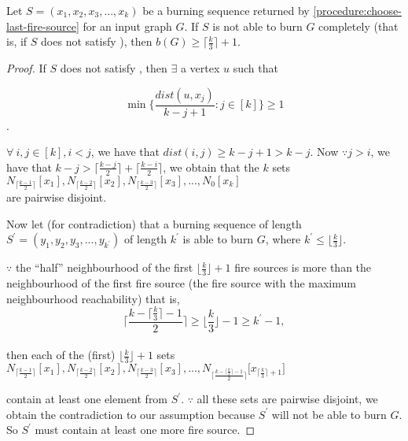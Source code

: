 \begin{lemma}\label{lemma:burn-seq-geq3}
Let $S = (x_1, x_2, x_3, . . ., x_k)$ be a burning sequence returned by \cref{procedure:choose-last-fire-source} for an input graph $G$. If $S$ is not able to burn $G$ completely (that is, if $S$ does not satisfy ), then $b(G)\geq \big\lceil \frac{k}{3}\big\rceil+1$.
\end{lemma}

\begin{proof}
If $S$ does not satisfy , then $\exists$ a vertex $u$ such that

$$\min \Big\{ \frac{dist(u,x_j)}{k-j+1} : j\in [k]\Big\} \geq 1$$.

$\forall\ i,j \in [k], i<j$, we have that $dist(i,j) \geq k-j+1 > k-j$. Now $\because j>i$, we have that $k-j > \big\lceil\frac{k-j}{2}\big\rceil + \big\lceil\frac{k-i}{2}\big\rceil$, we obtain that the $k$ sets\\
$N_{\lceil \frac{k-1}{2}\rceil}[x_1], N_{\lceil \frac{k-2}{2}\rceil}[x_2], N_{\lceil \frac{k-3}{2}\rceil}[x_3], . . ., N_0[x_{k}]$\\
are pairwise disjoint.

Now let (for contradiction) that a burning sequence of length $S^\prime = (y_1, y_2, y_3, . . ., y_{k^\prime})$ of length $k^\prime$ is able to burn $G$, where $k^\prime\leq \big\lfloor\frac{k}{3}\big\rfloor$.

$\because$ the ``half'' neighbourhood of the first $\big\lfloor\frac{k}{3}\big\rfloor+1$ fire sources is more than the neighbourhood of the first fire source (the fire source with the maximum neighbourhood reachability) that is,\\
$$\bigg\lceil\frac{k-\big\lceil\frac{k}{3}\big\rceil-1}{2}\bigg\rceil \geq \big\lfloor\frac{k}{3}\big\rfloor-1 \geq k^\prime-1,$$\\
then each of the (first) $\big\lfloor\frac{k}{3}\big\rfloor+1$ sets\\
$N_{\lceil \frac{k-1}{2}\rceil}[x_1], N_{\lceil \frac{k-2}{2}\rceil}[x_2], N_{\lceil \frac{k-3}{2}\rceil}[x_3], . . ., N_{\bigg\lceil\frac{k-\big\lceil\frac{k}{3}\big\rceil-1}{2}\bigg\rceil}\bigg[x_{\big\lceil\frac{k}{3}\big\rceil+1}\bigg]$

\noindent contain at least one element from $S^\prime$. $\because$ all these sets are pairwise disjoint, we obtain the contradiction to our assumption because $S^\prime$ will not be able to burn $G$. So $S^\prime$ must contain at least one more fire source.
\end{proof}


